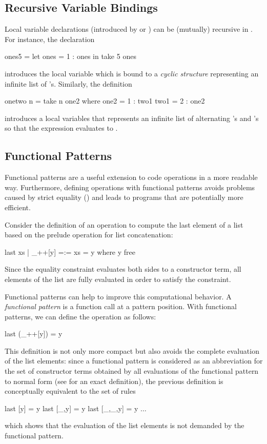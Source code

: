 \subsection{Recursive Variable Bindings}

Local variable declarations (introduced by 
or ) can be (mutually) recursive in \CYS.
For instance, the declaration
\begin{curry}
ones5 = let ones = 1 : ones
         in take 5 ones
\end{curry}
introduces the local variable  which is bound
to a \emph{cyclic structure}
representing an infinite list of 's.
Similarly, the definition
\begin{curry}
onetwo n = take n one2
 where
   one2 = 1 : two1
   two1 = 2 : one2
\end{curry}
introduces a local variables  that represents
an infinite list of alternating 's and 's
so that the expression  evaluates to \code{[1,2,1,2,1,2]}.


\subsection{Functional Patterns}

Functional patterns \cite{AntoyHanus05LOPSTR} are a useful extension
to code operations in a more readable way. Furthermore,
defining operations with functional patterns avoids problems
caused by strict equality (\ccode{=:=}) and leads to programs
that are potentially more efficient.

Consider the definition of an operation to compute the last element
of a list  based on the prelude operation \ccode{++}
for list concatenation:
\begin{curry}
last xs | _++[y] =:= xs  = y   where y free
\end{curry}
Since the equality constraint \ccode{=:=} evaluates both sides
to a constructor term, all elements of the list  are
fully evaluated in order to satisfy the constraint.

Functional patterns can help to improve this computational behavior.
A \emph{functional pattern}
is a function call at a pattern position. With functional patterns,
we can define the operation  as follows:
\begin{curry}
last (_++[y]) = y
\end{curry}
This definition is not only more compact but also avoids the complete
evaluation of the list elements: since a functional pattern is considered
as an abbreviation for the set of constructor terms obtained by all
evaluations of the functional pattern to normal form (see
\cite{AntoyHanus05LOPSTR} for an exact definition), the previous
definition is conceptually equivalent to the set of rules
\begin{curry}
last [y] = y
last [_,y] = y
last [_,_,y] = y
$\ldots$
\end{curry}
which shows that the evaluation of the list elements is not demanded
by the functional pattern.

